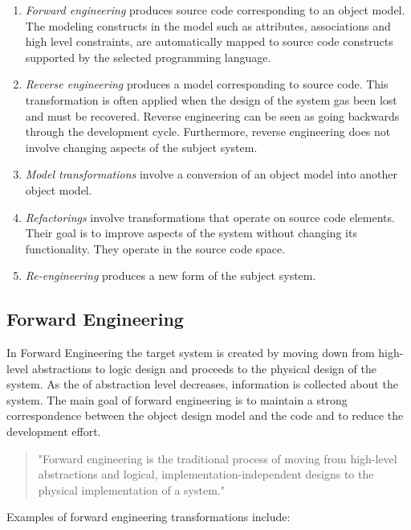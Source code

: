 \begin{enumerate}
\item \textit{Forward engineering} produces source code corresponding to an object model. The modeling constructs in the model such as attributes, associations and high level constraints, are automatically mapped to source code constructs supported by the selected programming language. 
\item \textit{Reverse engineering} produces a model corresponding to source code. This transformation is often applied when the design of the system gas been lost and must be recovered. Reverse engineering can be seen as going backwards through the development cycle. Furthermore, reverse engineering does not involve changing aspects of the subject system. 
\item \textit{Model transformations} involve a conversion of an object model into another object model. 
\item \textit{Refactorings} involve transformations that operate on source code elements. Their goal is to improve aspects of the system without changing its functionality. They operate in the source code space.
\item \textit{Re-engineering} produces a new form of the subject system. 
\end{enumerate}

\subsection{Forward Engineering}

In Forward Engineering the target system is created by moving down from high-level abstractions to logic design and proceeds to the physical design of the system. As the of abstraction level decreases, information is collected about the system. The main goal of forward engineering is to maintain a strong correspondence between the object design model and the code and to reduce the development effort. 

\begin{quote} 
"Forward engineering is the traditional process of moving from high-level abstractions and logical, implementation-independent designs to the physical implementation of a system." \cite{Chikofsky}
\end{quote} 

Examples of forward engineering transformations include:

